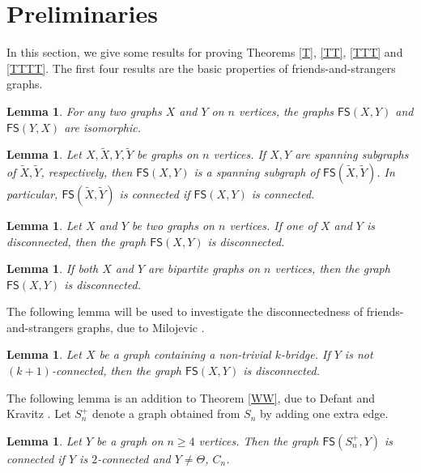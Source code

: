 \documentclass[11pt]{article}
\newtheorem{lem}[thm]{Lemma}%
\newcommand{\FS}{\mathsf{FS}}
\begin{document}
\section{Preliminaries}\label{s2}

In this section, we give some results for proving Theorems \ref{T}, \ref{TT}, \ref{TTT} and \ref{TTTT}. The first four results are the basic properties of friends-and-strangers graphs.
\begin{lem} \cite{DK} \label{dk} For any two graphs $X$ and $Y$ on $n$ vertices,
the graphs $\mathsf{FS}(X,Y)$ and $ \mathsf{FS}(Y,X)$ are isomorphic.\end{lem}
\begin{lem} \cite{DK} \label{asd}Let $X,\widetilde{X},Y,\widetilde{Y}$ be graphs on $n$ vertices. If $X, Y$ are  spanning subgraphs of $\widetilde{X}, \widetilde{Y}$, respectively, then $\mathsf{FS}(X,Y)$ is a spanning subgraph of $\mathsf{FS}(\widetilde{X},\widetilde{Y})$. In particular, $\mathsf{FS}(\widetilde{X},\widetilde{Y})$ is connected if $\mathsf{FS}(X,Y)$ is connected. 
\end{lem}


\begin{lem}\cite{DK}\label{20}
 Let $X$ and $Y$ be two graphs on $n$ vertices. If one of $X$ and $Y$ is disconnected, then the graph $\FS(X,Y)$ is disconnected.
\end{lem}

\begin{lem}\cite{DK}\label{21}
 If both $X$ and $Y$ are bipartite graphs on $n$ vertices, then the graph $\FS(X,Y)$ is disconnected.
\end{lem}

 The following lemma will be used to investigate the disconnectedness of friends-and-strangers graphs, due to Milojevic \cite{M}.

\begin{lem}\cite{M}\label{22}
Let $X$ be a graph containing a non-trivial $k$-bridge. If $Y$ is not $(k+1)$-connected, then the graph $\FS(X,Y)$ is disconnected.
\end{lem}


 The following lemma is an addition to Theorem \ref{WW}, due to Defant and Kravitz \cite{DK}. Let $S_n^+$ denote a graph obtained from $S_n$ by adding one extra edge.

\begin{lem}\cite{DK}\label{31}
Let $Y$ be a graph on $n\ge 4$ vertices. Then the graph $\FS(S_n^+,Y)$ is connected if  $Y$ is $2$-connected and $Y\not=\varTheta$, $C_n$.
\end{lem}
\end{document}
